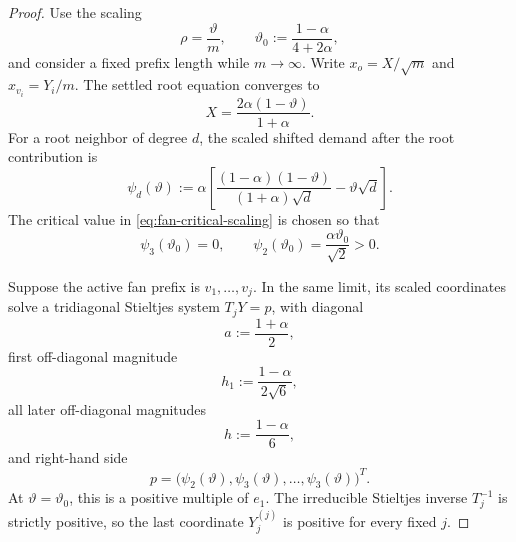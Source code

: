 \begin{proof}
Use the scaling
\begin{equation}
 \rho=\frac{\vartheta}{m},
 \qquad
 \vartheta_0:=\frac{1-\alpha}{4+2\alpha},
 \label{eq:fan-critical-scaling}
\end{equation}
and consider a fixed prefix length while $m\to\infty$.  Write
$x_o=X/\sqrt m$ and $x_{v_i}=Y_i/m$.  The settled root equation converges to
\begin{equation}
 X=\frac{2\alpha(1-\vartheta)}{1+\alpha}.
 \label{eq:fan-limit-root}
\end{equation}
For a root neighbor of degree $d$, the scaled shifted demand after the root
contribution is
\begin{equation}
 \psi_d(\vartheta)
 :=\alpha\left[
  \frac{(1-\alpha)(1-\vartheta)}{(1+\alpha)\sqrt d}
  -\vartheta\sqrt d
 \right].
 \label{eq:fan-limit-demand}
\end{equation}
The critical value in \cref{eq:fan-critical-scaling} is chosen so that
\begin{equation}
 \psi_3(\vartheta_0)=0,
 \qquad
 \psi_2(\vartheta_0)
 =\frac{\alpha\vartheta_0}{\sqrt2}>0.
 \label{eq:fan-critical-demands}
\end{equation}

Suppose the active fan prefix is $v_1,\ldots,v_j$.  In the same limit, its
scaled coordinates solve a tridiagonal Stieltjes system $T_jY=p$, with
diagonal
\begin{equation}
 a:=\frac{1+\alpha}{2},
 \label{eq:fan-core-diagonal}
\end{equation}
first off-diagonal magnitude
\begin{equation}
 h_1:=\frac{1-\alpha}{2\sqrt6},
 \label{eq:fan-first-coupling}
\end{equation}
all later off-diagonal magnitudes
\begin{equation}
 h:=\frac{1-\alpha}{6},
 \label{eq:fan-core-coupling}
\end{equation}
and right-hand side
\begin{equation}
 p=\bigl(\psi_2(\vartheta),
          \psi_3(\vartheta),\ldots,
          \psi_3(\vartheta)\bigr)^T.
 \label{eq:fan-core-load}
\end{equation}
At $\vartheta=\vartheta_0$, this is a positive multiple of $e_1$.
The irreducible Stieltjes inverse $T_j^{-1}$ is strictly positive, so the
last coordinate $Y_j^{(j)}$ is positive for every fixed $j$.


\end{proof}
